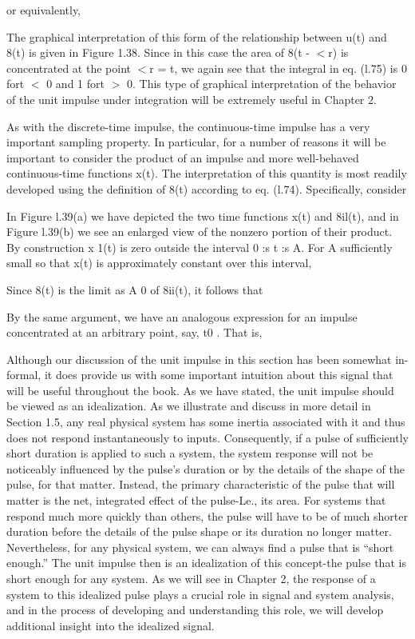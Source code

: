 \documentclass{report}
\begin{document}
or equivalently,



The graphical interpretation of this form of the relationship between u(t) and 8(t) is given in Figure 1.38. Since in this case the area of 8(t -
$<$r) is concentrated at the point $<$r = t, we again see that the integral in eq. (l.75) is 0 fort $<$ 0 and 1 fort $>$ 0. This type of graphical
interpretation of the behavior of the unit impulse under integration will be extremely useful in Chapter 2.





As with the discrete-time impulse, the continuous-time impulse has a very important sampling property. In particular, for a number of reasons it
will be important to consider the product of an impulse and more well-behaved continuous-time functions x(t). The interpretation of this quantity
is most readily developed using the definition of 8(t) according to eq. (l.74). Specifically, consider



In Figure l.39(a) we have depicted the two time functions x(t) and 8il(t), and in Figure l.39(b) we see an enlarged view of the nonzero portion of
their product. By construction x 1(t) is zero outside the interval 0 :s t :s A. For A sufficiently small so that x(t) is approximately constant over
this interval,



Since 8(t) is the limit as A { } 0 of 8ii(t), it follows that



By the same argument, we have an analogous expression for an impulse concentrated at an arbitrary point, say, t0 . That is,



Although our discussion of the unit impulse in this section has been somewhat in- formal, it does provide us with some important intuition about
this signal that will be useful throughout the book. As we have stated, the unit impulse should be viewed as an idealization. As we illustrate and
discuss in more detail in Section 1.5, any real physical system has some inertia associated with it and thus does not respond instantaneously to
inputs. Consequently, if a pulse of sufficiently short duration is applied to such a system, the system response will not be noticeably influenced
by the pulse{'}s duration or by the details of the shape of the pulse, for that matter. Instead, the primary characteristic of the pulse that will
matter is the net, integrated effect of the pulse-Le., its area. For systems that respond much more quickly than others, the pulse will have to be
of much shorter duration before the details of the pulse shape or its duration no longer matter. Nevertheless, for any physical system, we can always
find a pulse that is {``}short enough.{''} The unit impulse then is an idealization of this concept-the pulse that is short enough for any system.
As we will see in Chapter 2, the response of a system to this idealized pulse plays a crucial role in signal and system analysis, and in the process
of developing and understanding this role, we will develop additional insight into the idealized signal.
\end{document}

